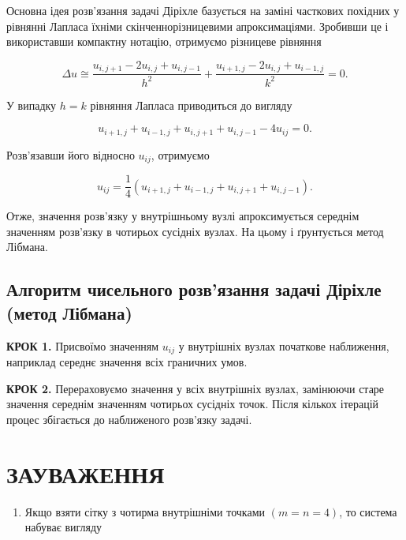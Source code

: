 \documentclass[
  ukrainian,
]{article}
\providecommand{\tightlist}{%
  \setlength{\itemsep}{0pt}\setlength{\parskip}{0pt}}
\begin{document}
Основна ідея розв'язання задачі Діріхле базується на заміні часткових
похідних у рівнянні Лапласа їхніми скінченнорізницевими апроксимаціями.
Зробивши це і використавши компактну нотацію, отримуємо різницеве
рівняння

\[\Delta u \cong\frac{u_{i,j+1}-2u_{i,j}+u_{i,j-1}}{h^2}+\frac{u_{i+1,j}-2u_{i,j}+u_{i-1,j}}{k^2}=0.\]

У випадку \(h=k\) рівняння Лапласа приводиться до вигляду

\[u_{i+1,j}+u_{i-1,j}+u_{i,j+1}+u_{i,j-1}-4u_{ij}=0.\]

Розв'язавши його відносно \(u_{ij}\), отримуємо

\[u_{ij}=\frac{1}{4}\left(u_{i+1,j}+u_{i-1,j}+u_{i,j+1}+u_{i,j-1}\right).\]

Отже, значення розв'язку у внутрішньому вузлі апроксимується середнім
значенням розв'язку в чотирьох сусідніх вузлах. На цьому і ґрунтується
метод Лібмана.

\subsection{Алгоритм чисельного розв'язання задачі Діріхле (метод
Лібмана)}\label{ux430ux43bux433ux43eux440ux438ux442ux43c-ux447ux438ux441ux435ux43bux44cux43dux43eux433ux43e-ux440ux43eux437ux432ux44fux437ux430ux43dux43dux44f-ux437ux430ux434ux430ux447ux456-ux434ux456ux440ux456ux445ux43bux435-ux43cux435ux442ux43eux434-ux43bux456ux431ux43cux430ux43dux430}

\textbf{КРОК 1.} Присвоїмо значенням \(u_{ij}\) у внутрішніх вузлах
початкове наближення, наприклад середнє значення всіх граничних умов.

\textbf{КРОК 2.} Перераховуємо значення у всіх внутрішніх вузлах,
замінюючи старе значення середнім значенням чотирьох сусідніх точок.
Після кількох ітерацій процес збігається до наближеного розв'язку
задачі.

\section{ЗАУВАЖЕННЯ}\label{ux437ux430ux443ux432ux430ux436ux435ux43dux43dux44f-12}

\begin{enumerate}
\def\labelenumi{\arabic{enumi}.}
\tightlist
\item
  Якщо взяти сітку з чотирма внутрішніми точками \((m=n=4)\), то система
  набуває вигляду
\end{enumerate}
\end{document}

